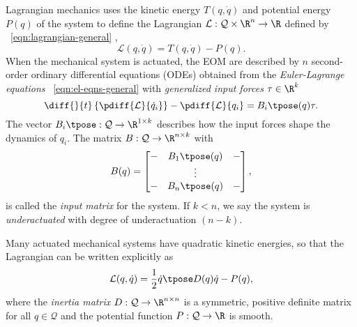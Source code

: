 Lagrangian mechanics uses the kinetic energy \(T(q,\dot{q})\) and potential
energy \(P(q)\) of the system to define the Lagrangian 
\(\mathcal{L} : \mathcal{Q}\times\R^n \rightarrow \R\) defined by
~\eqref{eqn:lagrangian-general} \cite{greenwood_dynamics},
\begin{equation}\label{eqn:lagrangian-general}
    \mathcal{L}(q,\dot{q}) = T(q,\dot{q}) - P(q)
    .
\end{equation}
When the mechanical system is actuated, the EOM are described by \(n\) second-order
ordinary differential equations (ODEs) obtained from the \textit{Euler-Lagrange
equations} ~\eqref{eqn:el-eqns-general} with \textit{generalized input forces} 
\(\tau \in \R^k\)
\begin{equation}\label{eqn:el-eqns-general}
    \diff{}{t}\left\{ \pdiff{\mathcal{L}}{\dot{q}_i} \right\}
    - \pdiff{\mathcal{L}}{q_i} = B_i\tpose(q) \tau
    .
\end{equation}
The vector \(B_i\tpose: \mathcal{Q} \rightarrow \R^{1\times k}\) describes how
the input forces shape the dynamics of \(q_i\).
The matrix  \(B: \mathcal{Q} \rightarrow \R^{n \times k}\) with
\[
    B(q) = \begin{bmatrix}
        - & B_1\tpose(q) & - \\
          & \vdots & \\
        - & B_n\tpose(q) & - \\
    \end{bmatrix}
    ,
\]
is called the \textit{input matrix} for the system.
If \(k < n\), we say the system is \textit{underactuated} with degree of
underactuation \((n - k)\).

Many actuated mechanical systems have quadratic kinetic energies, so that the
Lagrangian can be written explicitly as
\begin{equation}\label{eqn:lagrangian}
    \mathcal{L}(q,\dot{q}) = \frac{1}{2} \dot{q}\tpose D(q) \dot{q} - P(q)
    ,
\end{equation}
where the \textit{inertia matrix} \(D: \mathcal{Q} \rightarrow \R^{n\times n}\) 
is a symmetric, positive definite matrix for all \(q \in \mathcal{Q}\) and the
potential function \(P : \mathcal{Q} \rightarrow \R\) is smooth. 

